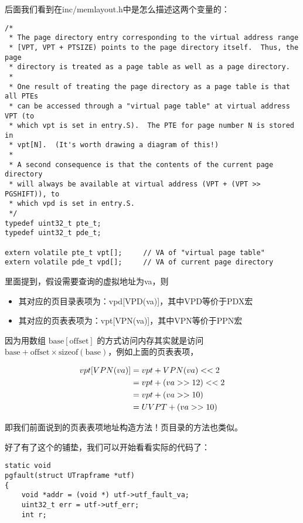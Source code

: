 \documentclass{article}
\begin{document}
\begin{CJK*}{UTF8}{gkai}
后面我们看到在inc/memlayout.h中是怎么描述这两个变量的：

\begin{lstlisting}[style=ccode, firstnumber=137, title={\scriptsize \ttfamily \bfseries inc/memlayout.h}]
/*
 * The page directory entry corresponding to the virtual address range
 * [VPT, VPT + PTSIZE) points to the page directory itself.  Thus, the page
 * directory is treated as a page table as well as a page directory.
 *
 * One result of treating the page directory as a page table is that all PTEs
 * can be accessed through a "virtual page table" at virtual address VPT (to
 * which vpt is set in entry.S).  The PTE for page number N is stored in
 * vpt[N].  (It's worth drawing a diagram of this!)
 *
 * A second consequence is that the contents of the current page directory
 * will always be available at virtual address (VPT + (VPT >> PGSHIFT)), to
 * which vpd is set in entry.S.
 */
typedef uint32_t pte_t;
typedef uint32_t pde_t;

extern volatile pte_t vpt[];     // VA of "virtual page table"
extern volatile pde_t vpd[];     // VA of current page directory
\end{lstlisting}

里面提到，假设需要查询的虚拟地址为va，则
\begin{itemize}
\item{其对应的页目录表项为：vpd[VPD(va)]，其中VPD等价于PDX宏}
\item{其对应的页表表项为：vpt[VPN(va)]，其中VPN等价于PPN宏}
\end{itemize}

因为用数组 $\mathrm{base}[\mathrm{offset}]$ 的方式访问内存其实就是访问$\mathrm{base} + \mathrm{offset} \times \mathrm{sizeof(base)}$，例如上面的页表表项，

\begin{align}
vpt[VPN(va)] &= vpt + VPN(va) << 2 \notag \\
             &= vpt + (va >> 12) << 2 \notag \\
             &= vpt + (va >> 10) \notag \\
             &= UVPT + (va >> 10) \notag  
\end{align}

即我们前面说到的页表表项地址构造方法！页目录的方法也类似。


好了有了这个的铺垫，我们可以开始看看实际的代码了：

\begin{lstlisting}[style=ccode, title={\scriptsize \ttfamily \bfseries lib/pgfault.c}]
static void
pgfault(struct UTrapframe *utf)
{
    void *addr = (void *) utf->utf_fault_va;
    uint32_t err = utf->utf_err;
    int r;


\end{lstlisting}
\end{CJK*}
\end{document}
